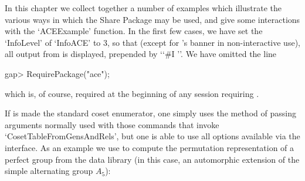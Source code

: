

In this chapter  we  collect  together  a  number  of  examples  which
illustrate the various ways in which the {\ACE} Share Package  may  be
used, and give some interactions with the  `ACEExample'  function.  In
the first few cases, we have set the `InfoLevel' of `InfoACE' to 3, so
that (except for {\ACE}'s banner in non-interactive use),  all  output
from {\ACE} is displayed, prepended by \lq{}`\#I ''. We  have  omitted
the line

\beginexample
gap> RequirePackage("ace");
\endexample

which is,  of  course,  required  at  the  beginning  of  any  session
requiring {\ACE}.


If {\ACE} is made the standard coset enumerator, one simply  uses  the
method of passing arguments normally used  with  those  commands  that
invoke `CosetTableFromGensAndRels', but one is able to use all options
available via the {\ACE} interface. As an example  we  use  {\ACE}  to
compute the permutation representation of a  perfect  group  from  the
data library (in this case, an automorphic  extension  of  the  simple
alternating group $A_5$):

